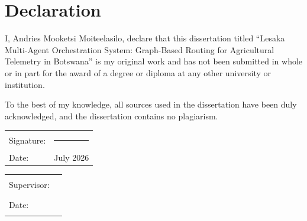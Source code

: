 
\chapter*{Declaration}

I, Andries Mooketsi Moiteelasilo, declare that this dissertation titled ``Lesaka Multi-Agent Orchestration System: Graph-Based Routing for Agricultural Telemetry in Botswana'' is my original work and has not been submitted in whole or in part for the award of a degree or diploma at any other university or institution.

To the best of my knowledge, all sources used in the dissertation have been duly acknowledged, and the dissertation contains no plagiarism.

\vspace{2cm}

\begin{tabular}{@{}p{}@{}p{}}
Signature: & \rule{6cm}{0.5pt} \\
Date: & July 2026 \\
\end{tabular}

\vspace{2cm}

\begin{tabular}{@{}p{}@{}p{}}
Supervisor: & \rule{6cm}{0.5pt} \\
Date: & \rule{6cm}{0.5pt} \\
\end{tabular}
